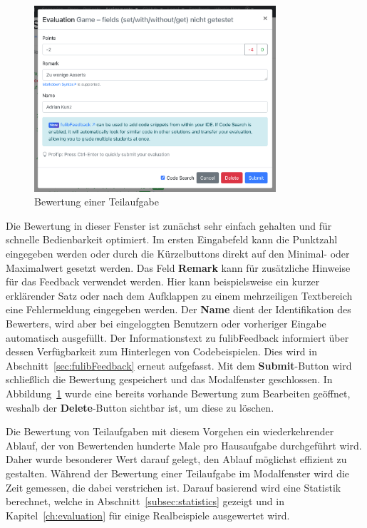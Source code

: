 \begin{figure}
    \centering
    \includegraphics[width=0.8\textwidth]{images/evaluation-modal}
    \caption{Bewertung einer Teilaufgabe}
    \label{fig:evaluation-modal}
\end{figure}

Die Bewertung in dieser Fenster ist zunächst sehr einfach gehalten und für schnelle Bedienbarkeit optimiert.
Im ersten Eingabefeld kann die Punktzahl eingegeben werden oder durch die Kürzelbuttons direkt auf den Minimal- oder Maximalwert gesetzt werden.
Das Feld \textbf{Remark} kann für zusätzliche Hinweise für das Feedback verwendet werden.
Hier kann beispielsweise ein kurzer erklärender Satz oder nach dem Aufklappen zu einem mehrzeiligen Textbereich eine Fehlermeldung eingegeben werden.
Der \textbf{Name} dient der Identifikation des Bewerters, wird aber bei eingeloggten Benutzern oder vorheriger Eingabe automatisch ausgefüllt.
Der Informationstext zu fulibFeedback informiert über dessen Verfügbarkeit zum Hinterlegen von Codebeispielen.
Dies wird in Abschnitt~\ref{sec:fulibFeedback} erneut aufgefasst.
Mit dem \textbf{Submit}-Button wird schließlich die Bewertung gespeichert und das Modalfenster geschlossen.
In Abbildung~\ref{fig:evaluation-modal} wurde eine bereits vorhande Bewertung zum Bearbeiten geöffnet, weshalb der \textbf{Delete}-Button sichtbar ist, um diese zu löschen.

Die Bewertung von Teilaufgaben mit diesem Vorgehen ein wiederkehrender Ablauf, der von Bewertenden hunderte Male pro Hausaufgabe durchgeführt wird.
Daher wurde besonderer Wert darauf gelegt, den Ablauf möglichst effizient zu gestalten.
Während der Bewertung einer Teilaufgabe im Modalfenster wird die Zeit gemessen, die dabei verstrichen ist.
Darauf basierend wird eine Statistik berechnet, welche in Abschnitt~\ref{subsec:statistics} gezeigt und in Kapitel~\ref{ch:evaluation} für einige Realbeispiele ausgewertet wird.

